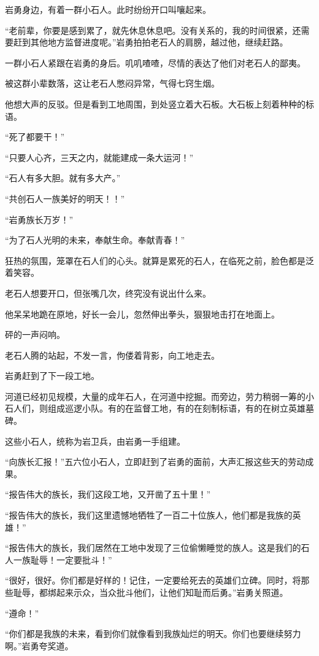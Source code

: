 \begin{this_body}
岩勇身边，有着一群小石人。此时纷纷开口叫嚷起来。

“老前辈，你要是感到累了，就先休息休息吧。没有关系的，我的时间很紧，还需要赶到其他地方监督进度呢。”岩勇拍拍老石人的肩膀，越过他，继续赶路。

一群小石人紧跟在岩勇的身后。叽叽喳喳，尽情的表达了他们对老石人的鄙夷。

被这群小辈数落，这让老石人憋闷异常，气得七窍生烟。

他想大声的反驳。但是看到工地周围，到处竖立着大石板。大石板上刻着种种的标语。

“死了都要干！”

“只要人心齐，三天之内，就能建成一条大运河！”

“石人有多大胆。就有多大产。”

“共创石人一族美好的明天！！”

“岩勇族长万岁！”

“为了石人光明的未来，奉献生命。奉献青春！”

狂热的氛围，笼罩在石人们的心头。就算是累死的石人，在临死之前，脸色都是泛着笑容。

老石人想要开口，但张嘴几次，终究没有说出什么来。

他呆呆地跪在原地，好长一会儿，忽然伸出拳头，狠狠地击打在地面上。

砰的一声闷响。

老石人腾的站起，不发一言，佝偻着背影，向工地走去。

岩勇赶到了下一段工地。

河道已经初见规模，大量的成年石人，在河道中挖掘。而旁边，劳力稍弱一筹的小石人们，则组成巡逻小队。有的在监督工地，有的在刻制标语，有的在树立英雄墓碑。

这些小石人，统称为岩卫兵，由岩勇一手组建。

“向族长汇报！”五六位小石人，立即赶到了岩勇的面前，大声汇报这些天的劳动成果。

“报告伟大的族长，我们这段工地，又开凿了五十里！”

“报告伟大的族长，我们这里遗憾地牺牲了一百二十位族人，他们都是我族的英雄！”

“报告伟大的族长，我们居然在工地中发现了三位偷懒睡觉的族人。这是我们的石人一族耻辱！一定要批斗！”

“很好，很好。你们都是好样的！记住，一定要给死去的英雄们立碑。同时，将那些耻辱，都绑起来示众，当众批斗他们，让他们知耻而后勇。”岩勇关照道。

“遵命！”

“你们都是我族的未来，看到你们就像看到我族灿烂的明天。你们也要继续努力啊。”岩勇夸奖道。


\end{this_body}
